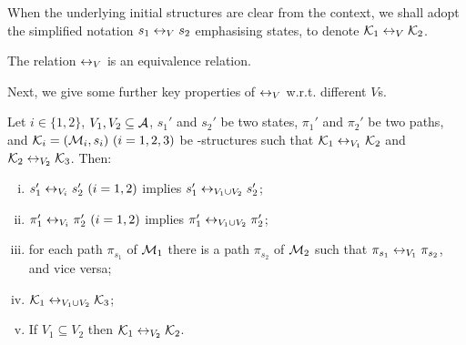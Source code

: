 \documentclass{article}
\begin{document}
When the underlying initial structures are clear from the context, we shall adopt the simplified notation $s_1 \leftrightarrow_V s_2$ emphasising states, to denote ${\cal K}_1 \leftrightarrow_V {\cal K}_2$.

\begin{lemma}\label{lem:equive}
  The relation $\leftrightarrow_V$ is an equivalence relation.
\end{lemma}

Next, we give some further key properties of $\leftrightarrow_V$ w.r.t. different $V$s.
\begin{proposition}\label{div}
Let $i\in \{1,2\}$, $V_1,V_2\subseteq\cal A$, $s_1'$ and $s_2'$ be two states,
  $\pi_1'$ and $\pi_2'$ be two paths,
and ${\cal K}_i=({\cal M}_i,s_i)~(i=1,2,3)$ be \MPK-structures
 such that
${\cal K}_1\leftrightarrow_{V_1}{\cal K}_2$ and ${\cal K}_2\leftrightarrow_{V_2}{\cal K}_3$.
 Then:
 \begin{enumerate}[(i)]
   \item $s_1'\leftrightarrow_{V_i}s_2'~(i=1,2)$ implies $s_1'\leftrightarrow_{V_1\cup V_2}s_2'$;
   \item $\pi_1'\leftrightarrow_{V_i}\pi_2'~(i=1,2)$ implies $\pi_1'\leftrightarrow_{V_1\cup V_2}\pi_2'$;
   \item for each path $\pi_{s_1}$ of ${\cal M}_1$ there is a path $\pi_{s_2}$  of ${\cal M}_2$ such that $\pi_{s_1} \leftrightarrow_{V_1} \pi_{s_2}$, and vice versa;
   \item ${\cal K}_1\leftrightarrow_{V_1\cup V_2}{\cal K}_3$;
   \item If $V_1 \subseteq V_2$ then ${\cal K}_1 \leftrightarrow_{V_2} {\cal K}_2$.
 \end{enumerate}
\end{proposition}

\end{document}
